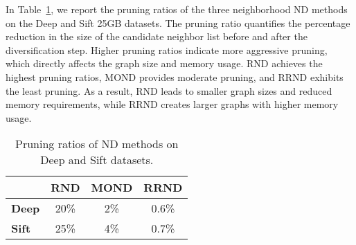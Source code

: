 In Table~\ref{tab:pruning_ratio}, we report the pruning ratios of the three neighborhood ND methods on the Deep and Sift 25GB datasets. 
 The pruning ratio quantifies the percentage reduction in the size of the candidate neighbor list before and after the diversification step. Higher pruning ratios indicate more aggressive pruning, which directly affects the graph size and memory usage. RND achieves the highest pruning ratios, MOND provides moderate pruning, and RRND exhibits the least pruning. 
 As a result, RND leads to smaller graph sizes and reduced memory requirements, while RRND creates larger graphs with higher memory usage.
\begin{comment}
\begin{figure}[tb]
	\captionsetup{justification=centering}
	\centering	
    \texttt{[image: ../img-png/Experiments/RNG/pruningratio\_n.png]}
    		\caption{{Pruning Ratios of ND Methods on Deep and Sift Datasets}}
\label{fig:ND:search:pr}
 \end{figure}    
\end{comment}
\begin{table}[tb]
{\normalsize
\centering
\begin{tabular}{@{}lccc@{}}
\toprule
         & \textbf{RND} & \textbf{MOND} & \textbf{RRND} \\ 
\midrule
\textbf{Deep} & 20\%        & 2\%          & 0.6\%         \\ 
\textbf{Sift} & 25\%        & 4\%          & 0.7\%         \\ 
\bottomrule
\end{tabular}
} 
\caption{Pruning ratios of ND methods on Deep and Sift datasets.}
\label{tab:pruning_ratio}
\end{table}








